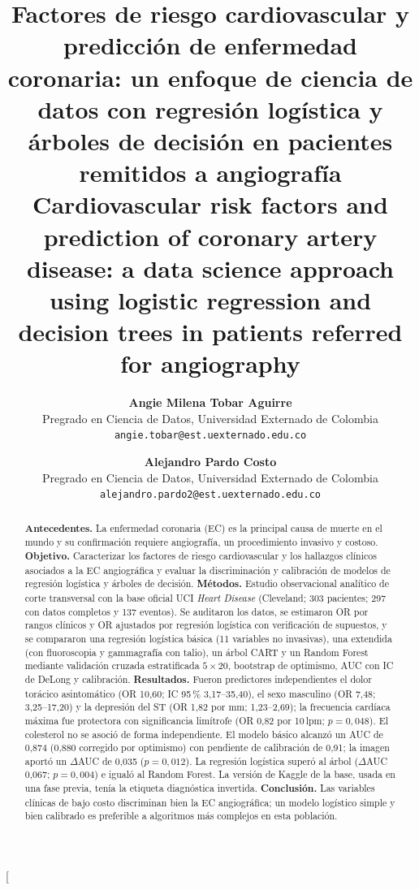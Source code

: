 \documentclass[twocolumn,10pt]{article}
\title{\fontsize{15}{17}\selectfont
\vspace*{-0.7cm}
\textbf{Factores de riesgo cardiovascular y predicci\'on de enfermedad coronaria: un enfoque de ciencia de datos con regresi\'on log\'istica y \'arboles de decisi\'on en pacientes remitidos a angiograf\'ia}\\[0.25cm]
\fontsize{11}{13}\selectfont
\textbf{Cardiovascular risk factors and prediction of coronary artery disease: a data science approach using logistic regression and decision trees in patients referred for angiography}\\[0.2cm]}
\author{
  \begin{tabular}{c}
    \textbf{Angie Milena Tobar Aguirre}\\
    \small Pregrado en Ciencia de Datos, Universidad Externado de Colombia\\
    \small \texttt{angie.tobar@est.uexternado.edu.co}
  \end{tabular}
  \and
  \begin{tabular}{c}
    \textbf{Alejandro Pardo Costo}\\
    \small Pregrado en Ciencia de Datos, Universidad Externado de Colombia\\
    \small \texttt{alejandro.pardo2@est.uexternado.edu.co}
  \end{tabular}
}
\date{}
\begin{document}
\twocolumn
[
\begin{@twocolumnfalse}
\maketitle
\begin{abstract}
\vspace*{0.3cm}
\justify
\fontsize{9.5pt}{11pt}\selectfont
\textbf{Antecedentes.} La enfermedad coronaria (EC) es la principal causa de muerte en el mundo y su confirmaci\'on requiere angiograf\'ia, un procedimiento invasivo y costoso. \textbf{Objetivo.} Caracterizar los factores de riesgo cardiovascular y los hallazgos cl\'inicos asociados a la EC angiogr\'afica y evaluar la discriminaci\'on y calibraci\'on de modelos de regresi\'on log\'istica y \'arboles de decisi\'on. \textbf{M\'etodos.} Estudio observacional anal\'itico de corte transversal con la base oficial UCI \textit{Heart Disease} (Cleveland; 303 pacientes; 297 con datos completos y 137 eventos). Se auditaron los datos, se estimaron OR por rangos cl\'inicos y OR ajustados por regresi\'on log\'istica con verificaci\'on de supuestos, y se compararon una regresi\'on log\'istica b\'asica (11 variables no invasivas), una extendida (con fluoroscopia y gammagraf\'ia con talio), un \'arbol CART y un Random Forest mediante validaci\'on cruzada estratificada $5\times20$, bootstrap de optimismo, AUC con IC de DeLong y calibraci\'on. \textbf{Resultados.} Fueron predictores independientes el dolor tor\'acico asintom\'atico (OR 10,60; IC 95\,\% 3,17--35,40), el sexo masculino (OR 7,48; 3,25--17,20) y la depresi\'on del ST (OR 1,82 por mm; 1,23--2,69); la frecuencia card\'iaca m\'axima fue protectora con significancia lim\'itrofe (OR 0,82 por 10\,lpm; $p=0{,}048$). El colesterol no se asoci\'o de forma independiente. El modelo b\'asico alcanz\'o un AUC de 0,874 (0,880 corregido por optimismo) con pendiente de calibraci\'on de 0,91; la imagen aport\'o un $\Delta$AUC de 0,035 ($p=0{,}012$). La regresi\'on log\'istica super\'o al \'arbol ($\Delta$AUC 0,067; $p=0{,}004$) e igual\'o al Random Forest. La versi\'on de Kaggle de la base, usada en una fase previa, ten\'ia la etiqueta diagn\'ostica invertida. \textbf{Conclusi\'on.} Las variables cl\'inicas de bajo costo discriminan bien la EC angiogr\'afica; un modelo log\'istico simple y bien calibrado es preferible a algoritmos m\'as complejos en esta poblaci\'on.

\end{abstract}


\end{@twocolumnfalse}
\end{document}
